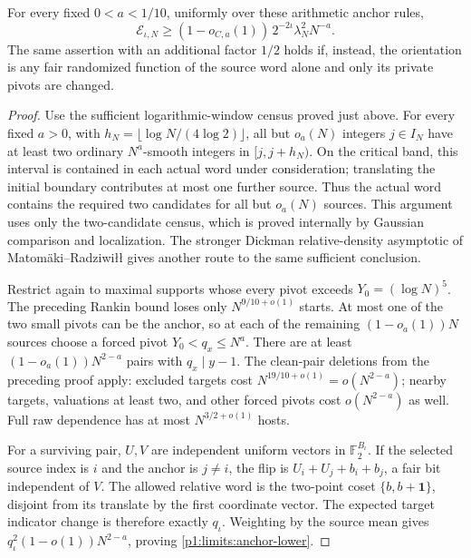 \begin{proposition}
\label{p1:limits:all-anchors}
For every fixed $0<a<1/10$, uniformly over these arithmetic
anchor rules,
\begin{equation}
 \mathcal E_{\iota,N}\ge
       (1-o_{C,a}(1))\,2^{-2\iota}\lambda_N^2N^{-a}.
 \label{p1:limits:anchor-lower}
\end{equation}
The same assertion with an additional factor $1/2$ holds
if, instead, the orientation is any fair randomized
function of the source word alone and only its private
pivots are changed.
\end{proposition}
\begin{proof}
Use the sufficient logarithmic-window census proved just above.  For every fixed $a>0$, with
$h_N=\lfloor\log N/(4\log2)\rfloor$, all but $o_a(N)$ integers
$j\in I_N$ have at least two ordinary $N^a$-smooth integers in
$[j,j+h_N)$.  On the critical band, this interval is contained
in each actual word under consideration; translating the initial
boundary contributes at most one further source.
Thus the actual word contains the required two candidates for all
but $o_a(N)$ sources.  This argument uses only the two-candidate
census, which is proved internally by Gaussian comparison and
localization.  The stronger Dickman relative-density asymptotic
of Matom\"aki--Radziwi{\l}{\l}
\cite[Corollary~6]{matomakiradziwill2016} gives another route to
the same sufficient conclusion.

Restrict again to maximal supports whose every pivot
exceeds $Y_0=(\log N)^5$.  The preceding Rankin bound
loses only $N^{9/10+o(1)}$ starts.  At most one of the
two small pivots can be the anchor, so at each of the
remaining $(1-o_a(1))N$ sources choose a forced pivot
$Y_0<q_x\le N^a$.  There are at least
$(1-o_a(1))N^{2-a}$ pairs with $q_x\mid y-1$.
The clean-pair deletions from the preceding proof apply:
excluded targets cost $N^{19/10+o(1)}=o(N^{2-a})$;
nearby targets, valuations at least two, and other forced
pivots cost $o(N^{2-a})$ as well.  Full raw dependence
has at most $N^{3/2+o(1)}$ hosts.

For a surviving pair, $U,V$ are independent uniform
vectors in $\mathbb F_2^{B_\iota}$.  If the selected
source index is $i$ and the anchor is $j\ne i$, the flip
is $U_i+U_j+b_i+b_j$, a fair bit independent of $V$.
The allowed relative word is the two-point coset
$\{b,b+\boldsymbol1\}$, disjoint from its translate by
the first coordinate vector.  The expected target
indicator change is therefore exactly $q_\iota$.
Weighting by the source mean gives
$q_\iota^2(1-o(1))N^{2-a}$, proving
\eqref{p1:limits:anchor-lower}.


\end{proof}
